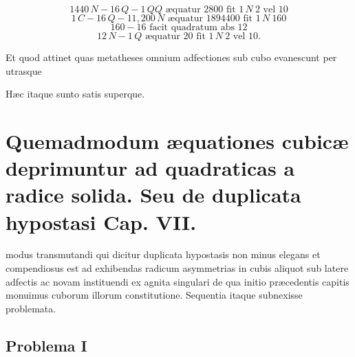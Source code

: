 \documentclass[11pt,a4paper]{article}
\begin{document}
\[ 1440\,N - 16\,Q - 1\,QQ \text{ æquatur } 2800 \text{ fit } 1\,N\ 2 \text{ vel } 10 \]
\[ 1\,C - 16\,Q - 11{,}200\,N \text{ æquatur } 1894400 \text{ fit } 1\,N\ 160 \]
\[ 160 - 16 \text{ facit quadratum abs } 12 \]
\[ 12\,N - 1\,Q \text{ æquatur } 20 \text{ fit } 1\,N\ 2 \text{ vel } 10. \]

Et quod attinet  quas metatheses  omnium adfectiones sub cubo evanescunt \struck{\ill{}}  per utrasque 

Hæc itaque sunto satis superque.

\section*{Quemadmodum æquationes cubicæ deprimuntur ad quadraticas a radice solida. Seu de duplicata hypostasi Cap. VII.}

 modus transmutandi qui dicitur duplicata hypostasis non minus elegans et compendiosus est ad exhibendas radicum asymmetrias in cubis aliquot sub latere adfectis ac  novam instituendi  ex agnita singulari de qua initio præcedentis capitis monuimus cuborum illorum constitutione. Sequentia itaque  subnexisse problemata.

\subsection*{Problema I}
\end{document}
